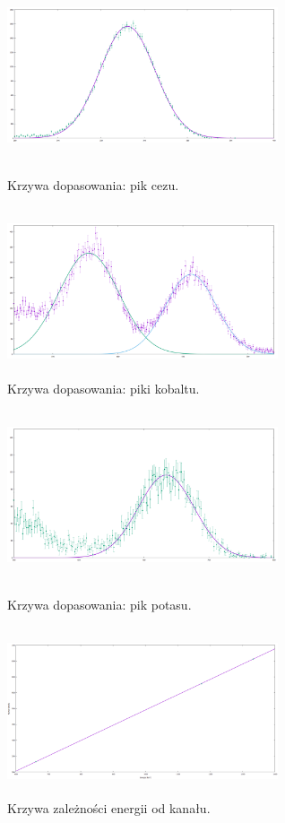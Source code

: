 \documentclass[10pt,a4paper]{article}
\begin{document}
 \begin{figure}[h!]
\centering
\begin{minipage}{0.5\textwidth}
  \centering
  \includegraphics[width=8cm, height=5cm ]{rap14rys4} 
\caption{Krzywa dopasowania: pik cezu.}
\end{minipage}%
\begin{minipage}{0.5\textwidth}
  \centering
  \includegraphics[width=8cm, height=5cm ]{rap14rys5} 
\caption{Krzywa dopasowania: piki kobaltu.}
\end{minipage}
\end{figure}
\begin{figure}[h!]
\centering
\begin{minipage}{0.5\textwidth}
  \centering
  \includegraphics[width=8cm, height=5cm ]{rap14rys6} 
\caption{Krzywa dopasowania: pik potasu.}
\end{minipage}%
\begin{minipage}{0.5\textwidth}
  \centering
  \includegraphics[width=8cm, height=5cm ]{rap14rys7} 
\caption{Krzywa zależności energii od kanału.}
\end{minipage}
\end{figure}
\end{document}
